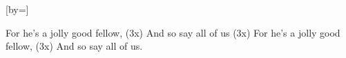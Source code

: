  

[by=]




\beginverse
    For he's a jolly good fellow, (3x)
    And so say all of us (3x)
    For he's a jolly good fellow, (3x)
    And so say all of us.
\endverse




\endsong
